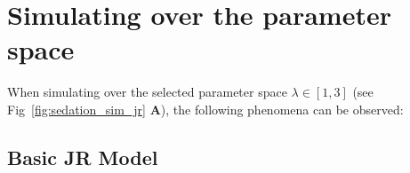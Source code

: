 %
%
%
%
%


\section{Simulating over the parameter space}\label{sec:simulating-over-the-parameter-space}

When simulating over the selected parameter space $ \lambda \in \left[ 1, 3 \right] $ (see Fig~\ref{fig:sedation_sim_jr}
\textbf{A}),
the following phenomena can be observed:



\newtoggle{drawLocRoc}

\subsection{Basic JR Model}


